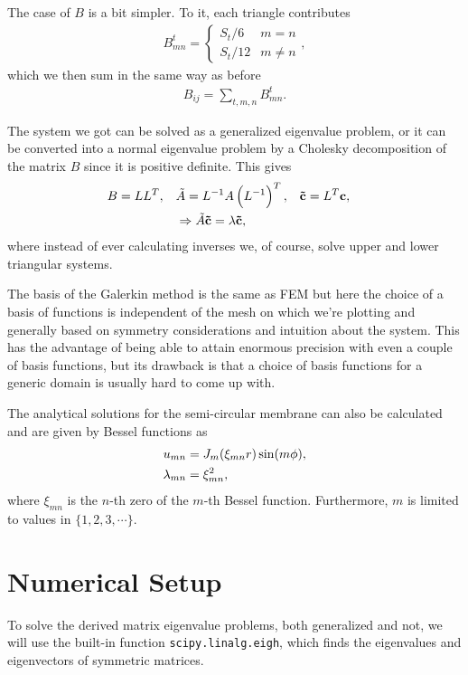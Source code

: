 \documentclass[10pt,a4paper,twocolumn]{article}
\renewcommand{\vec}[1]{\bm{\mathrm{#1}}}
\begin{document}
The case of $B$ is a bit simpler. To it, each triangle contributes
%
\begin{align}
    B^{t}_{mn} = \begin{cases}
        S_t/6 & m=n\\
        S_t/12 & m \neq n
    \end{cases},
\end{align}
%
which we then sum in the same way as before
%
\begin{align}
    B_{i j} = \sum_{t, m, n} B^{t}_{mn}.
\end{align}


The system we got can be solved as a generalized eigenvalue problem, or it can be converted into a normal eigenvalue problem by a Cholesky decomposition of the matrix $B$ since it is positive definite. This gives
%
\begin{align}
    &B = L L^T,& &\tilde{A}=L^{-1} A \left(L^{-1}\right)^T,& &\vec{\tilde{c}} = L^T \vec{c},& \notag\\
    & & &\Rightarrow \tilde{A} \vec{\tilde{c}} = \lambda \vec{\tilde{c}},& & &
\end{align}
%
where instead of ever calculating inverses we, of course, solve upper and lower triangular systems.

The basis of the Galerkin method is the same as FEM but here the choice of a basis of functions is independent of the mesh on which we're plotting and generally based on symmetry considerations and intuition about the system. This has the advantage of being able to attain enormous precision with even a couple of basis functions, but its drawback is that a choice of basis functions for a generic domain is usually hard to come up with.

The analytical solutions for the semi-circular membrane can also be calculated and are given by Bessel functions as
%
\begin{align}
    u_{mn} &= J_m(\xi_{mn} r) \sin(m \phi),\notag\\
    \lambda_{mn} &= \xi_{mn}^2,
\end{align}
%
where $\xi_{mn}$ is the $n$-th zero of the $m$-th Bessel function. Furthermore, $m$ is limited to values in $\{ 1, 2, 3, \cdots \}$.


\section{Numerical Setup}

To solve the derived matrix eigenvalue problems, both generalized and not, we will use the built-in function \texttt{scipy.linalg.eigh}, which finds the eigenvalues and eigenvectors of symmetric matrices.
\end{document}
